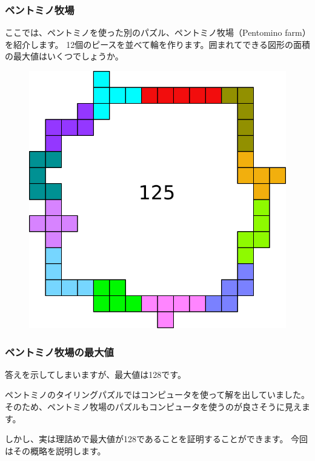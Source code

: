 \documentclass{beamer}
\begin{document}
\begin{frame}
    \frametitle{ペントミノ牧場}

    ここでは、ペントミノを使った別のパズル、ペントミノ牧場（Pentomino farm）を紹介します。
    12個のピースを並べて輪を作ります。囲まれてできる図形の面積の最大値はいくつでしょうか。

    \begin{figure}
        \includegraphics[scale=0.2]{images/PentominoFarm.png}
    \end{figure}
\end{frame}

\begin{frame}
    \frametitle{ペントミノ牧場の最大値}

    答えを示してしまいますが、最大値は128です。

    \bigskip

    ペントミノのタイリングパズルではコンピュータを使って解を出していました。
    そのため、ペントミノ牧場のパズルもコンピュータを使うのが良さそうに見えます。

    \bigskip

    しかし、実は理詰めで最大値が128であることを証明することができます。
    今回はその概略を説明します。
\end{frame}
\end{document}
